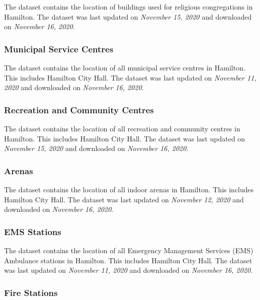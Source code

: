 \documentclass[
]{article}
\begin{document}
The dataset contains the location of buildings used for religious
congregations in Hamilton. The dataset was last updated on
\emph{November 15, 2020} and downloaded on \emph{November 16, 2020}.

\hypertarget{municipal-service-centres}{%
\subsubsection{Municipal Service
Centres}\label{municipal-service-centres}}

The dataset contains the location of all municipal service centres in
Hamilton. This includes Hamilton City Hall. The dataset was last updated
on \emph{November 11, 2020} and downloaded on \emph{November 16, 2020}.

\hypertarget{recreation-and-community-centres}{%
\subsubsection{Recreation and Community
Centres}\label{recreation-and-community-centres}}

The dataset contains the location of all recreation and community
centres in Hamilton. This includes Hamilton City Hall. The dataset was
last updated on \emph{November 15, 2020} and downloaded on
\emph{November 16, 2020}.

\hypertarget{arenas}{%
\subsubsection{Arenas}\label{arenas}}

The dataset contains the location of all indoor arenas in Hamilton. This
includes Hamilton City Hall. The dataset was last updated on
\emph{November 12, 2020} and downloaded on \emph{November 16, 2020}.

\hypertarget{ems-stations}{%
\subsubsection{EMS Stations}\label{ems-stations}}

The dataset contains the location of all Emergency Management Services
(EMS) Ambulance stations in Hamilton. This includes Hamilton City Hall.
The dataset was last updated on \emph{November 11, 2020} and downloaded
on \emph{November 16, 2020}.

\hypertarget{fire-stations}{%
\subsubsection{Fire Stations}\label{fire-stations}}
\end{document}
